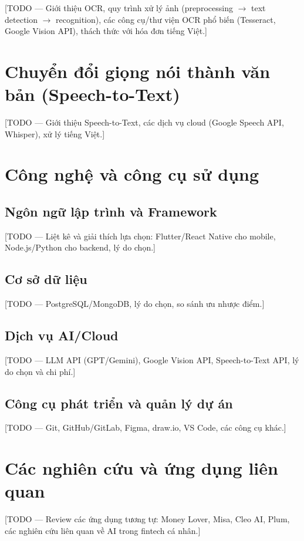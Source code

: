 [TODO --- Giới thiệu OCR, quy trình xử lý ảnh (preprocessing $\rightarrow$ text detection $\rightarrow$ recognition), các công cụ/thư viện OCR phổ biến (Tesseract, Google Vision API), thách thức với hóa đơn tiếng Việt.]

\section{Chuyển đổi giọng nói thành văn bản (Speech-to-Text)}
\label{sec:speech_to_text}

[TODO --- Giới thiệu Speech-to-Text, các dịch vụ cloud (Google Speech API, Whisper), xử lý tiếng Việt.]

\section{Công nghệ và công cụ sử dụng}
\label{sec:technology_stack}

\subsection{Ngôn ngữ lập trình và Framework}
\label{subsec:languages_frameworks}

[TODO --- Liệt kê và giải thích lựa chọn: Flutter/React Native cho mobile, Node.js/Python cho backend, lý do chọn.]

\subsection{Cơ sở dữ liệu}
\label{subsec:databases}

[TODO --- PostgreSQL/MongoDB, lý do chọn, so sánh ưu nhược điểm.]

\subsection{Dịch vụ AI/Cloud}
\label{subsec:ai_cloud_services}

[TODO --- LLM API (GPT/Gemini), Google Vision API, Speech-to-Text API, lý do chọn và chi phí.]

\subsection{Công cụ phát triển và quản lý dự án}
\label{subsec:dev_tools}

[TODO --- Git, GitHub/GitLab, Figma, draw.io, VS Code, các công cụ khác.]

\section{Các nghiên cứu và ứng dụng liên quan}
\label{sec:related_works}

[TODO --- Review các ứng dụng tương tự: Money Lover, Misa, Cleo AI, Plum, các nghiên cứu liên quan về AI trong fintech cá nhân.]
